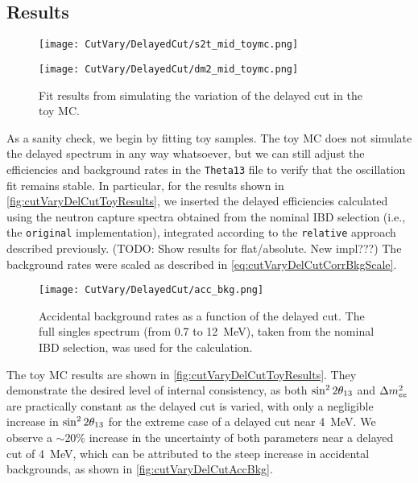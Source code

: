 \documentclass[../thesis.tex]{subfiles}
\begin{document}
\subsection{Results}
\label{sec:cutVaryDelCutResults}

\begin{figure}[ht]
  \begin{minipage}{0.5\linewidth}%
    \texttt{[image: CutVary/DelayedCut/s2t\_mid\_toymc.png]}%
  \end{minipage}%
  \begin{minipage}{0.5\linewidth}%
    \texttt{[image: CutVary/DelayedCut/dm2\_mid\_toymc.png]}%
  \end{minipage}%
  \caption{Fit results from simulating the variation of the delayed cut in the toy MC.}
  \label{fig:cutVaryDelCutToyResults}
\end{figure}

As a sanity check, we begin by fitting toy samples. The toy MC does not simulate the delayed spectrum in any way whatsoever, but we can still adjust the efficiencies and background rates in the \texttt{Theta13} file to verify that the oscillation fit remains stable. In particular, for the results shown in \autoref{fig:cutVaryDelCutToyResults}, we inserted the delayed efficiencies calculated using the neutron capture spectra obtained from the nominal IBD selection (i.e., the \texttt{original} implementation), integrated according to the \texttt{relative} approach described previously. (TODO: Show results for flat/absolute. New impl???) The background rates were scaled as described in \autoref{eq:cutVaryDelCutCorrBkgScale}.

\begin{figure}[ht]
  \texttt{[image: CutVary/DelayedCut/acc\_bkg.png]}
  \caption{Accidental background rates as a function of the delayed cut. The full singles spectrum (from 0.7 to 12~MeV), taken from the nominal IBD selection, was used for the calculation.}
  \label{fig:cutVaryDelCutAccBkg}
\end{figure}

The toy MC results are shown in \autoref{fig:cutVaryDelCutToyResults}. They demonstrate the desired level of internal consistency, as both $\sin^2 2\theta_{13}$ and $\Delta m^2_{ee}$ are practically constant as the delayed cut is varied, with only a negligible increase in $\sin^2 2\theta_{13}$ for the extreme case of a delayed cut near 4~MeV. We observe a $\sim$20\% increase in the uncertainty of both parameters near a delayed cut of 4~MeV, which can be attributed to the steep increase in accidental backgrounds, as shown in \autoref{fig:cutVaryDelCutAccBkg}.
\end{document}
